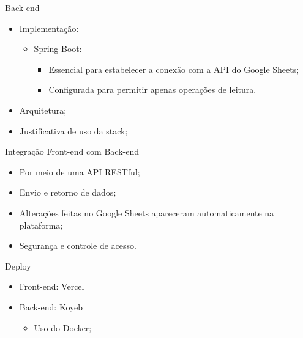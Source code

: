 \begin{frame}{Back-end}
    \begin{itemize}
        \item Implementação: \vspace{0.5cm}
              \begin{itemize}
                  \item Spring Boot: \vspace{0.5cm}
                        \begin{itemize}
                            \item Essencial para estabelecer a conexão com a API do Google Sheets; \vspace{0.5cm}
                            \item Configurada para permitir apenas operações de leitura. \vspace{0.5cm}
                        \end{itemize}
              \end{itemize}
        \item Arquitetura; \vspace{0.5cm}
        \item Justificativa de uso da stack; \vspace{0.5cm}
    \end{itemize}
\end{frame}

\begin{frame}{Integração Front-end com Back-end}
    \begin{itemize}
        \item Por meio de uma API RESTful; \vspace{0.5cm}
        \item Envio e retorno de dados; \vspace{0.5cm}
        \item Alterações feitas no Google Sheets apareceram automaticamente na plataforma; \vspace{0.5cm}
        \item Segurança e controle de acesso. \vspace{0.5cm}
    \end{itemize}
\end{frame}

\begin{frame}{Deploy}
    \begin{itemize}
        \item Front-end: Vercel \vspace{0.5cm}
        \item Back-end: Koyeb \vspace{0.5cm}
              \begin{itemize}
                  \item Uso do Docker; \vspace{0.25cm}
              \end{itemize}
    \end{itemize}
\end{frame}

